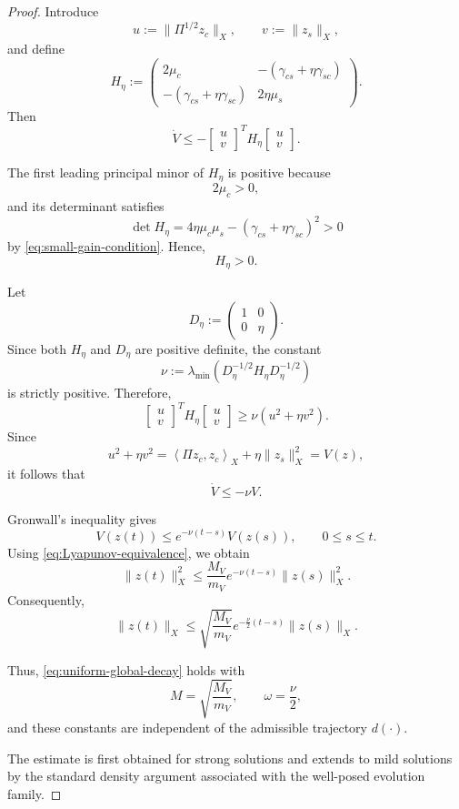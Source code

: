 \documentclass[10pt,a4paper]{amsart}
\begin{document}
\begin{proof}
Introduce
\[
u:=\|\Pi^{1/2}z_c\|_X,
\qquad
v:=\|z_s\|_X,
\]
and define
\[
H_\eta
:=
\begin{pmatrix}
2\mu_c
&
-\left(
\gamma_{cs}+\eta\gamma_{sc}
\right)
\\[1mm]
-\left(
\gamma_{cs}+\eta\gamma_{sc}
\right)
&
2\eta\mu_s
\end{pmatrix}.
\]
Then
\[
\dot V
\le
-
\begin{bmatrix}
u\\
v
\end{bmatrix}^{\!T}
H_\eta
\begin{bmatrix}
u\\
v
\end{bmatrix}.
\]

The first leading principal minor of \(H_\eta\) is positive because
\[
2\mu_c>0,
\]
and its determinant satisfies
\[
\det H_\eta
=
4\eta\mu_c\mu_s
-
\left(
\gamma_{cs}
+
\eta\gamma_{sc}
\right)^2
>
0
\]
by \eqref{eq:small-gain-condition}.
Hence,
\[
H_\eta>0.
\]

Let
\[
D_\eta
:=
\begin{pmatrix}
1&0\\
0&\eta
\end{pmatrix}.
\]
Since both \(H_\eta\) and \(D_\eta\) are positive definite, the constant
\[
\nu
:=
\lambda_{\min}
\left(
D_\eta^{-1/2}
H_\eta
D_\eta^{-1/2}
\right)
\]
is strictly positive. Therefore,
\[
\begin{bmatrix}
u\\
v
\end{bmatrix}^{\!T}
H_\eta
\begin{bmatrix}
u\\
v
\end{bmatrix}
\ge
\nu
\left(
u^2+\eta v^2
\right).
\]
Since
\[
u^2+\eta v^2
=
\left\langle
\Pi z_c,
z_c
\right\rangle_X
+
\eta\|z_s\|_X^2
=
V(z),
\]
it follows that
\begin{equation}
\dot V
\le
-\nu V.
\label{eq:global-Lyapunov-decay}
\end{equation}

Gronwall's inequality gives
\[
V(z(t))
\le
e^{-\nu(t-s)}
V(z(s)),
\qquad
0\le s\le t.
\]
Using
\eqref{eq:Lyapunov-equivalence}, we obtain
\[
\|z(t)\|_X^2
\le
\frac{M_V}{m_V}
e^{-\nu(t-s)}
\|z(s)\|_X^2.
\]
Consequently,
\[
\|z(t)\|_X
\le
\sqrt{\frac{M_V}{m_V}}
e^{-\frac{\nu}{2}(t-s)}
\|z(s)\|_X.
\]

Thus, \eqref{eq:uniform-global-decay}
holds with
\[
M
=
\sqrt{\frac{M_V}{m_V}},
\qquad
\omega
=
\frac{\nu}{2},
\]
and these constants are independent of the admissible trajectory \(d(\cdot)\).

The estimate is first obtained for strong solutions and extends to mild solutions by the standard density argument associated with the well-posed evolution family.

\end{proof}
\end{document}
